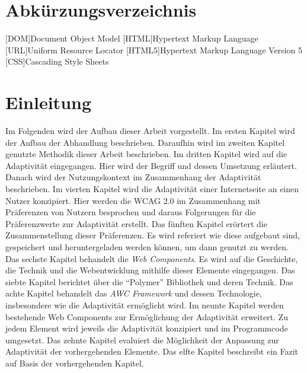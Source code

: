 \documentclass[12pt, paper=a4, bibtotoc, toc=listof, headsepline=true]{scrreprt}
\begin{document}
\chapter*{Abkürzungsverzeichnis}
\begin{acronym}
	[DOM]{Document Object Model}
	[HTML]{Hypertext Markup Language}
	[URL]{Uniform Resource Locator}
	[HTML5]{Hypertext Markup Language Version 5}
	[CSS]{Cascading Style Sheets}
\end{acronym}

\tableofcontents



\chapter{Einleitung}
Im Folgenden wird der Aufbau dieser Arbeit vorgestellt. Im ersten Kapitel wird der Aufbau der Abhandlung beschrieben. Daraufhin wird im zweiten Kapitel genutzte Methodik dieser Arbeit beschrieben. Im dritten Kapitel wird auf die Adaptivität eingegangen. Hier wird der Begriff und dessen Umsetzung erläutert. Danach wird der Nutzungskontext im Zusammenhang der Adaptivität beschrieben. Im vierten Kapitel wird die Adaptivität einer Internetseite an einen Nutzer konzipiert. Hier werden die \ac{WCAG 2.0} im Zusammenhang mit Präferenzen von Nutzern besprochen und daraus Folgerungen für die Präferenzwerte zur Adaptivität erstellt. Das fünften Kapitel erörtert die Zusammenstellung dieser Präferenzen. Es wird referiert wie diese aufgebaut sind, gespeichert und heruntergeladen werden können, um dann genutzt zu werden. Das sechste Kapitel behandelt die \emph{Web Components}. Es wird auf die Geschichte, die Technik und die Webentwicklung mithilfe dieser Elemente eingegangen. Das siebte Kapitel berichtet über die \enquote{Polymer} Bibliothek und deren Technik. Das achte Kapitel behandelt das \emph{AWC Framework} und dessen Technologie, insbesondere wie die Adaptivität ermöglicht wird. Im neunte Kapitel werden bestehende Web Components zur Ermöglichung der Adaptivität erweitert. Zu jedem Element wird jeweils die Adaptivität konzipiert und im Programmcode umgesetzt. Das zehnte Kapitel evaluiert die Möglichkeit der Anpassung zur Adaptivität der vorhergehenden Elemente. Das elfte Kapitel beschreibt ein Fazit auf Basis der vorhergehenden Kapitel. 
\end{document}
